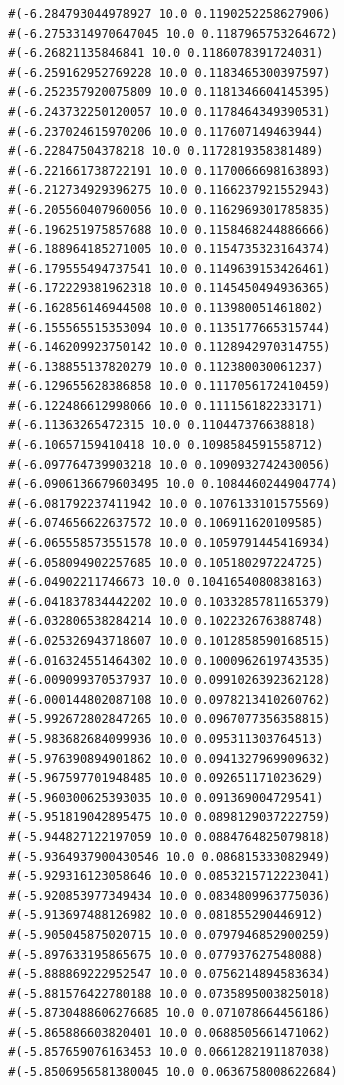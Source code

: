 \documentclass [11pt]{book}
\begin{document}
\begin{itemize}
\begin{figure}
\begin{lrbox}{\boxedverb}
\begin{minipage}{\linewidth}
{\begin{verbatim}
  #(-6.284793044978927 10.0 0.1190252258627906)
  #(-6.2753314970647045 10.0 0.1187965753264672)
  #(-6.26821135846841 10.0 0.1186078391724031)
  #(-6.259162952769228 10.0 0.1183465300397597)
  #(-6.252357920075809 10.0 0.1181346604145395)
  #(-6.243732250120057 10.0 0.1178464349390531)
  #(-6.237024615970206 10.0 0.117607149463944)
  #(-6.22847504378218 10.0 0.1172819358381489)
  #(-6.221661738722191 10.0 0.1170066698163893)
  #(-6.212734929396275 10.0 0.1166237921552943)
  #(-6.205560407960056 10.0 0.1162969301785835)
  #(-6.196251975857688 10.0 0.1158468244886666)
  #(-6.188964185271005 10.0 0.1154735323164374)
  #(-6.179555494737541 10.0 0.1149639153426461)
  #(-6.172229381962318 10.0 0.1145450494936365)
  #(-6.162856146944508 10.0 0.113980051461802)
  #(-6.155565515353094 10.0 0.1135177665315744)
  #(-6.146209923750142 10.0 0.1128942970314755)
  #(-6.138855137820279 10.0 0.112380030061237)
  #(-6.129655628386858 10.0 0.1117056172410459)
  #(-6.122486612998066 10.0 0.111156182233171)
  #(-6.11363265472315 10.0 0.110447376638818)
  #(-6.10657159410418 10.0 0.1098584591558712)
  #(-6.097764739903218 10.0 0.1090932742430056)
  #(-6.0906136679603495 10.0 0.1084460244904774)
  #(-6.081792237411942 10.0 0.1076133101575569)
  #(-6.074656622637572 10.0 0.106911620109585)
  #(-6.065558573551578 10.0 0.1059791445416934)
  #(-6.058094902257685 10.0 0.105180297224725)
  #(-6.04902211746673 10.0 0.1041654080838163)
  #(-6.041837834442202 10.0 0.1033285781165379)
  #(-6.032806538284214 10.0 0.102232676388748)
  #(-6.025326943718607 10.0 0.1012858590168515)
  #(-6.016324551464302 10.0 0.1000962619743535)
  #(-6.009099370537937 10.0 0.0991026392362128)
  #(-6.000144802087108 10.0 0.0978213410260762)
  #(-5.992672802847265 10.0 0.0967077356358815)
  #(-5.983682684099936 10.0 0.095311303764513)
  #(-5.976390894901862 10.0 0.0941327969909632)
  #(-5.967597701948485 10.0 0.092651171023629)
  #(-5.960300625393035 10.0 0.091369004729541)
  #(-5.951819042895475 10.0 0.0898129037222759)
  #(-5.944827122197059 10.0 0.0884764825079818)
  #(-5.9364937900430546 10.0 0.086815333082949)
  #(-5.929316123058646 10.0 0.0853215712223041)
  #(-5.920853977349434 10.0 0.0834809963775036)
  #(-5.913697488126982 10.0 0.081855290446912)
  #(-5.905045875020715 10.0 0.0797946852900259)
  #(-5.897633195865675 10.0 0.077937627548088)
  #(-5.888869222952547 10.0 0.0756214894583634)
  #(-5.881576422780188 10.0 0.0735895003825018)
  #(-5.8730488606276685 10.0 0.071078664456186)
  #(-5.865886603820401 10.0 0.0688505661471062)
  #(-5.857659076163453 10.0 0.0661282191187038)
  #(-5.8506956581380045 10.0 0.0636758008622684)

\end{verbatim}}
\end{minipage}
\end{lrbox}
\end{figure}
\end{itemize}
\end{document}
